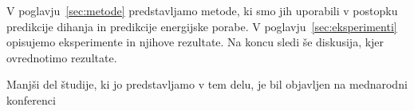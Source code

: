 V poglavju~\ref{sec:metode}  predstavljamo metode, ki smo jih uporabili v postopku predikcije dihanja in predikcije energijske porabe. V poglavju~\ref{sec:eksperimenti} opisujemo eksperimente in njihove rezultate. Na koncu sledi še diskusija, kjer ovrednotimo rezultate.

Manjši del študije, ki jo predstavljamo v tem delu, je bil objavljen na mednarodni konferenci~\cite{j}